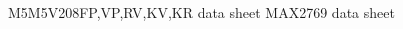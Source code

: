 \begin{thebibliography}{99}


 M5M5V208FP,VP,RV,KV,KR data sheet
 MAX2769 data sheet




\end{thebibliography}

